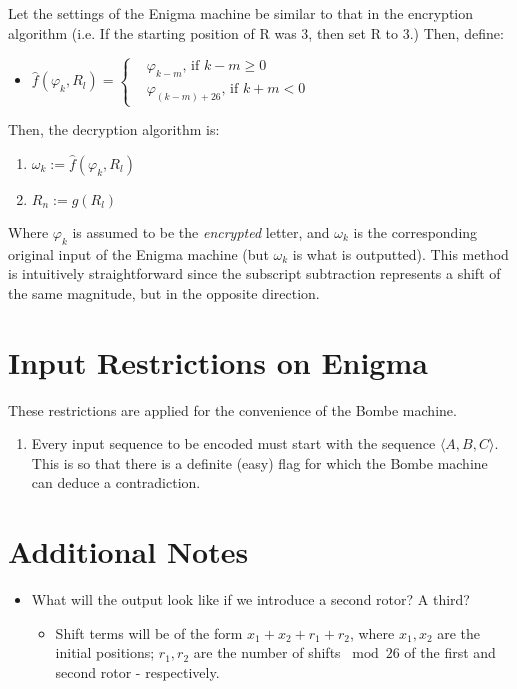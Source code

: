 \documentclass[12pt,a4paper]{article}
\begin{document}
	\newcommand{\fhat}{\hat{f}}
	Let the settings of the Enigma machine be similar to that in the encryption algorithm (i.e. If the starting position of R was $3$, then set R to $3$.) Then, define:

	 \begin{itemize}
		\item $\fhat(\varphi_k, R_l)= 					
					\begin{cases} 
						&\varphi_{k-m} \text{, if } {k-m} \geq 0 \\
						&\varphi_{(k-m)+26} \text{, if }{k+m} < 0
					\end{cases}
			  $ 
	\end{itemize}

	Then, the decryption algorithm is:
	

	\begin{enumerate}
		\item $\omega_k := \fhat(\varphi_k, R_l)$
		\item $R_n := g(R_l)$
	\end{enumerate}

	Where $\varphi_k$ is assumed to be the \emph{encrypted} letter, and $\omega_k$ is the corresponding original input of the Enigma machine (but $\omega_k$ is what is outputted). This method is intuitively straightforward since the subscript subtraction represents a shift of the same magnitude, but in the opposite direction. \\

	

	\section{Input Restrictions on Enigma}
	These restrictions are applied for the convenience of the Bombe machine.

	\begin{enumerate}
		\item Every input sequence to be encoded must start with the sequence $\langle A, B, C \rangle$.
		This is so that there is a definite (easy) flag for which the Bombe machine can deduce a contradiction.
		
	\end{enumerate}
	
			
	\section{Additional Notes}
		\begin{itemize}
			\item What will the output look like if we introduce a second rotor? A third?
			
			\begin{itemize}
				\item Shift terms will be of the form $x_1 + x_2 + r_1 + r_2$, where $x_1, x_2$ are the initial positions; $r_1, r_2$ are the number of shifts $\bmod{ 26}$ of the first and second rotor - respectively.
			\end{itemize}					
			
		\end{itemize}
\end{document}

